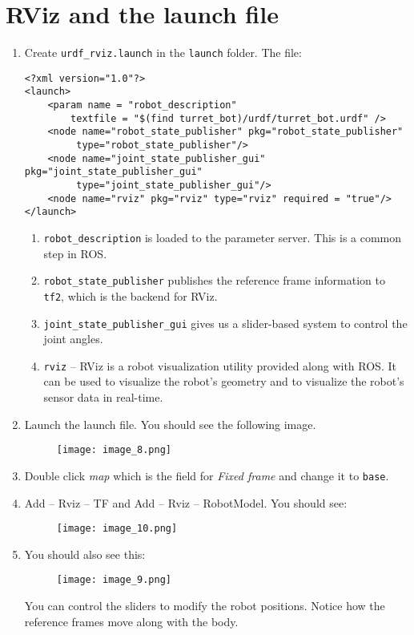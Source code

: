 \documentclass{article}
\begin{document}
    \section{RViz and the launch file}
        \begin{enumerate}
            \item Create \texttt{urdf\_rviz.launch} in the \texttt{launch} folder. The file:
            \begin{verbatim}
<?xml version="1.0"?>
<launch>
    <param name = "robot_description" 
        textfile = "$(find turret_bot)/urdf/turret_bot.urdf" />
    <node name="robot_state_publisher" pkg="robot_state_publisher"
         type="robot_state_publisher"/>
    <node name="joint_state_publisher_gui" pkg="joint_state_publisher_gui"
         type="joint_state_publisher_gui"/>
    <node name="rviz" pkg="rviz" type="rviz" required = "true"/>
</launch>
            \end{verbatim}
            \begin{enumerate}
                \item \texttt{robot\_description} is loaded to the parameter server. This is a common step in ROS.
                \item \texttt{robot\_state\_publisher} publishes the reference frame information to \texttt{tf2}, which 
                is the backend for RViz.
                \item \texttt{joint\_state\_publisher\_gui} gives us a slider-based system to control the joint angles.
                \item \texttt{rviz} -- RViz is a robot visualization utility provided along with ROS. It can be used to
                visualize the robot's geometry and to visualize the robot's sensor data in real-time.
            \end{enumerate}
            \item Launch the launch file. You should see the following image.
            \begin{figure}[H]
                \center
                \texttt{[image: image\_8.png]}
            \end{figure}
            \newpage
            \item Double click \emph{map} which is the field for \emph{Fixed frame} and change it to \texttt{base}.
            \item Add -- Rviz -- TF and Add -- Rviz -- RobotModel. You should see:
            \begin{figure}[H]
                \center
                \texttt{[image: image\_10.png]}
            \end{figure}
            \item You should also see this:
            \begin{figure}[H]
                \center
                \texttt{[image: image\_9.png]}
            \end{figure}
            You can control the sliders to modify the robot positions. Notice how the reference frames 
            move along with the body.
        \end{enumerate}
        \newpage
\end{document}
